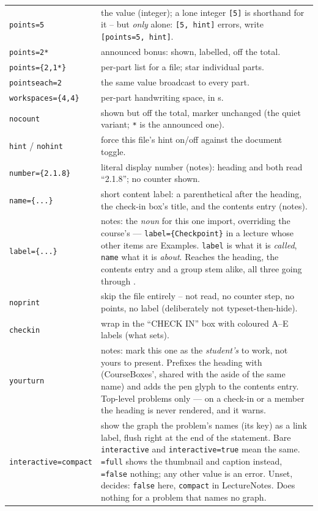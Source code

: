 \begin{center}
\begin{tabularx}{\linewidth}{@{}l Y@{}}
\texttt{points=5} & the value (integer); a lone integer \texttt{[5]} is
  shorthand for it -- but \emph{only} alone: \texttt{[5, hint]} errors,
  write \texttt{[points=5, hint]}.\\
\texttt{points=2*} & announced bonus: shown, labelled, off the total.\\
\texttt{points=\{2,1*\}} & per-part list for a  file; star
  individual parts.\\
\texttt{pointseach=2} & the same value broadcast to every part.\\
\texttt{workspaces=\{4,4\}} & per-part handwriting space, in
  s.\\
\texttt{nocount} & shown but off the total, marker unchanged (the quiet
  variant; \texttt{*} is the announced one).\\
\texttt{hint} / \texttt{nohint} & force this file's hint on/off against
  the document toggle.\\
\texttt{number=\{2.1.8\}} & literal display number (notes): heading and
   both read ``2.1.8''; no counter shown.\\
\texttt{name=\{...\}} & short content label: a parenthetical after the
  heading, the check-in box's title, and the contents entry (notes).\\
\texttt{label=\{...\}} & notes: the \emph{noun} for this one import, overriding
  the course's  --- \texttt{label=\{Checkpoint\}} in a
  lecture whose other items are Examples. \texttt{label} is what it is
  \emph{called}, \texttt{name} what it is \emph{about}. Reaches the heading, the
  contents entry and a group stem alike, all three going through
  .\\
\texttt{noprint} & skip the file entirely -- not read, no counter step, no
  points, no label (deliberately not typeset-then-hide).\\
\texttt{checkin} & wrap in the ``CHECK IN'' box with coloured A--E labels
  (what  sets).\\
\texttt{yourturn} & notes: mark this one as the \emph{student's} to work, not
  yours to present. Prefixes the heading with  (CourseBoxes',
  shared with the aside of the same name) and adds the pen glyph to the
  contents entry. Top-level problems only --- on a check-in or a
   member the heading is never rendered, and it warns.\\
\texttt{interactive=compact} & show the graph the problem's
   names (its  key) as a link label, flush
  right at the end of the statement. Bare \texttt{interactive} and
  \texttt{interactive=true} mean the same. \texttt{=full} shows the thumbnail
  and caption instead, \texttt{=false} nothing; any other value is an
  error. Unset,  decides: \texttt{false}
  here, \texttt{compact} in LectureNotes. Does nothing for a problem
  that names no graph.\\
\end{tabularx}
\end{center}

